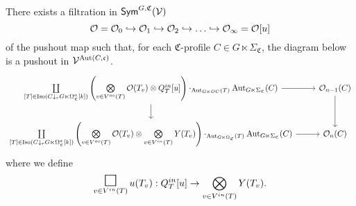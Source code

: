 \documentclass[a4paper,10pt
,draft
]{article}%
\renewcommand{\1}{\eta}%
\newcommand{\SC}{\Sigma_{\mathfrak C}}
\newcommand{\OC}{\Omega_{\mathfrak C}}
\begin{document}
\begin{proposition}
      \label{FILT_PUSH_PROP}
      There exists a filtration in $\mathsf{Sym}^{G, \mathfrak C}(\mathcal V)$
      \begin{equation}
            \O = \O_0 \into \O_1 \into \O_2 \into \dots \into \O_\infty = \O[u]
      \end{equation}
      of the pushout map
      such that, for each $\mathfrak C$-profile $C \in G \ltimes \Sigma_{\mathfrak C}$,
      the diagram below is a pushout in $\mathcal V^{\operatorname{Aut}(C, \mathfrak c)}$.
      \begin{equation}
            \label{FILT_PUSHG_EQ}
            \begin{tikzcd}
                  \mathop{\coprod}\limits_{[T] \in \Iso(C \downarrow_r G \ltimes \Omega_{\mathfrak C}^a[k])}
                  \left(
                        \mathop{\bigotimes}\limits_{v \in V^{ac}(T)} \O(T_v) \otimes
                        Q^{in}_T[u]
                  \right) \cdot_{\Aut_{G \ltimes OC}(T)} \Aut_{G \ltimes \SC}(C)
                  \arrow[r]
                  \arrow[d]
                  &
                  \O_{n-1}(C) \arrow[d]
                  \\                  
                  \mathop{\coprod}\limits_{[T] \in \Iso(C \downarrow_r G \ltimes \Omega_{\mathfrak C}^a[k])}
                  \left(
                        \mathop{\bigotimes}\limits_{v \in V^{ac}(T)} \O(T_v) \otimes
                        \mathop{\bigotimes}\limits_{v \in V^{in}(T)} Y(T_v)
                  \right) \cdot_{\Aut_{G \ltimes \OC}(T)} \Aut_{G \ltimes \SC}(C)
                  \arrow[r]
                  &
                  \O_n(C)
            \end{tikzcd}
      \end{equation}
      where we define
      \begin{equation}
            \mathop{\mathlarger{\mathlarger{\mathlarger{\square}}}}_{v \in V^{in}(T)} u(T_v): Q^{in}_T[u] \to \bigotimes_{v \in V^{in}(T)} Y(T_v).
      \end{equation}
\end{proposition}
\end{document}
